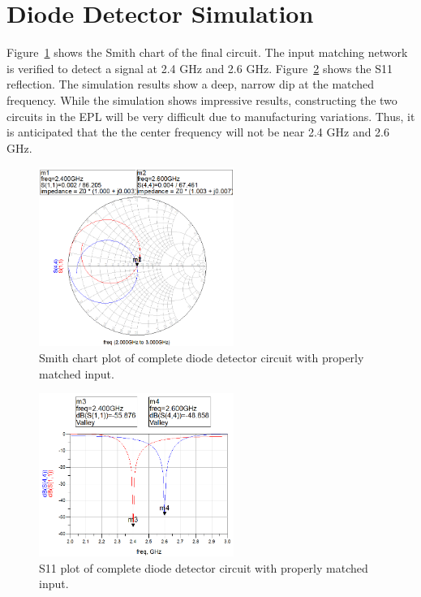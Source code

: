\documentclass[conference]{IEEEtran}
\begin{document}
\section{Diode Detector Simulation}
Figure~\ref{fig:FinalDDSmith} shows the Smith chart of the final circuit. The input matching network is verified to detect a signal at 2.4 GHz and 2.6 GHz. Figure~\ref{fig:FinalDDS11} shows the S11 reflection. The simulation results show a deep, narrow dip at the matched frequency. While the simulation shows impressive results, constructing the two circuits in the EPL will be very difficult due to manufacturing variations. Thus, it is anticipated that the the center frequency will not be near 2.4 GHz and 2.6 GHz.

\begin{figure}[!htb]
\centering
\includegraphics[width=2.5in]{diode-pics/diodedetectorSmithmatched-final.png}
\caption{Smith chart plot of complete diode detector circuit with properly matched input.}
\label{fig:FinalDDSmith}
\end{figure}

\begin{figure}[!htb]
\centering
\includegraphics[width=2.5in]{diode-pics/diodedetectorS11matched-final.png}
\caption{S11 plot of complete diode detector circuit with properly matched input.}
\label{fig:FinalDDS11}
\end{figure}
\end{document}
